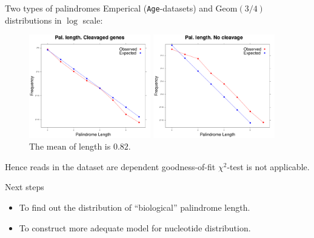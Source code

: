 \documentclass{beamer}\usepackage[]{graphicx}\usepackage[]{color}
\begin{document}
\begin{frame}{Two types of palindromes}
  Emperical (\texttt{Age}-datasets) and $\mathrm{Geom}(3/4)$ distributions in $\log$ scale:
 \begin{figure}[h]
  \begin{minipage}[h]{0.49\linewidth}
    \center\includegraphics[width=150pt]{distr_pal_len_cl.pdf}
    \caption{\footnotesize{The $\mathrm{mean}$  of length is $0.33$.}}
  \end{minipage}
  \hfill
  \begin{minipage}[h]{0.49\linewidth}
   \includegraphics[width=150pt]{distr_pal_len_nocl.pdf}
   \caption{\footnotesize{The $\mathrm{mean}$ of length is $0.82$.}} 
  \end{minipage}
 \end{figure}
 
 \pause
 {\color{blue} Hence reads in the dataset are dependent goodness-of-fit $\chi^2$-test is not applicable. }
\end{frame}


\begin{frame}{Next steps}
  \begin{itemize}
    \item To find out the distribution of ``biological'' palindrome length.
    \item To construct more adequate model for nucleotide distribution.
  \end{itemize}
\end{frame}
\end{document}
